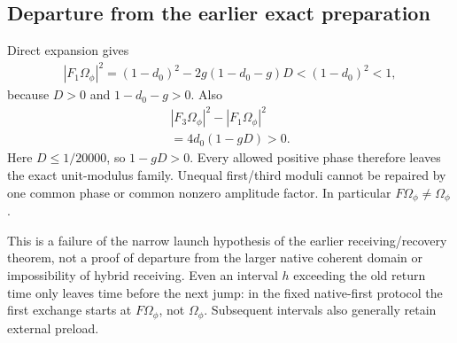 \subsection{Departure from the earlier exact preparation}\label{sec:familyexit}
Direct expansion gives
\begin{equation}\label{eq:a31}%
\begin{gathered}
|F_1\Omega_\phi|^2=(1-d_0)^2-2g(1-d_0-g)D<(1-d_0)^2<1,
\end{gathered}
\end{equation}
because $D>0$ and $1-d_0-g>0$. Also
\begin{equation}\label{eq:a32}%
\begin{gathered}
|F_3\Omega_\phi|^2-|F_1\Omega_\phi|^2\\ =4d_0(1-gD)>0.
\end{gathered}
\end{equation}
Here $D\le1/20000$, so $1-gD>0$. Every allowed positive phase therefore leaves the exact unit-modulus family. Unequal first/third moduli cannot be repaired by one common phase or common nonzero amplitude factor. In particular $F\Omega_\phi\ne\Omega_\phi$.

This is a failure of the narrow launch hypothesis of the earlier receiving/recovery theorem, not a proof of departure from the larger native coherent domain or impossibility of hybrid receiving. Even an interval $h$ exceeding the old return time only leaves time before the next jump: in the fixed native-first protocol the first exchange starts at $F\Omega_\phi$, not $\Omega_\phi$. Subsequent intervals also generally retain external preload.
